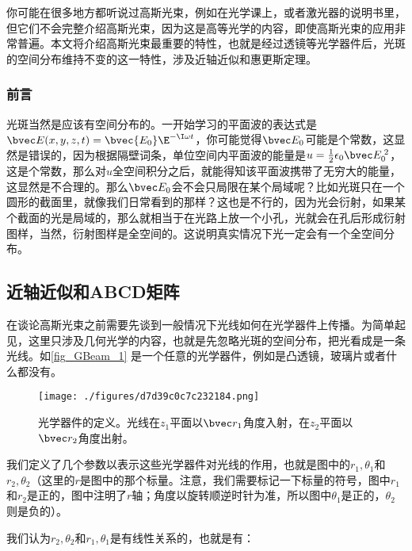 
\begin{issues}
\issueDraft
\end{issues}

你可能在很多地方都听说过高斯光束，例如在光学课上，或者激光器的说明书里，但它们不会完整介绍高斯光束，因为这是高等光学的内容，即使高斯光束的应用非常普遍。本文将介绍高斯光束最重要的特性，也就是经过透镜等光学器件后，光斑的空间分布维持不变的这一特性，涉及近轴近似和惠更斯定理。%

\subsubsection{前言}
光斑当然是应该有空间分布的。一开始学习的平面波的表达式是$\bvec E(x,y,z,t)=\bvec {E_0}\E^{-\I\omega t}$，你可能觉得$\bvec E_0$可能是个常数，这显然是错误的，因为根据隔壁词条，单位空间内平面波的能量是$u=\frac{1}{2}\epsilon_0 \bvec E_0^{\;2}$，这是个常数，那么对$u$全空间积分之后，就能得知该平面波携带了无穷大的能量，这显然是不合理的。那么$\bvec E_0$会不会只局限在某个局域呢？比如光斑只在一个圆形的截面里，就像我们日常看到的那样？这也是不行的，因为光会衍射，如果某个截面的光是局域的，那么就相当于在光路上放一个小孔，光就会在孔后形成衍射图样，当然，衍射图样是全空间的。这说明真实情况下光一定会有一个全空间分布。

\subsection{近轴近似和ABCD矩阵}
在谈论高斯光束之前需要先谈到一般情况下光线如何在光学器件上传播。为简单起见，这里只涉及几何光学的内容，也就是先忽略光斑的空间分布，把光看成是一条光线。如\autoref{fig_GBeam_1} 是一个任意的光学器件，例如是凸透镜，玻璃片或者什么都没有。
\begin{figure}[ht]
\centering
\texttt{[image: ./figures/d7d39c0c7c232184.png]}
\caption{光学器件的定义。光线在$z_1$平面以$\bvec r_1$角度入射，在$z_2$平面以$\bvec r_2$角度出射。} \label{fig_GBeam_1}
\end{figure}
我们定义了几个参数以表示这些光学器件对光线的作用，也就是图中的$r_1,\theta_1$和$r_2,\theta_2$（这里的$r$是图中的那个标量。注意，我们需要标记一下标量的符号，图中$r_1$和$r_2$是正的，图中注明了$r$轴；角度以旋转顺逆时针为准，所以图中$\theta_1$是正的，$\theta_2$则是负的）。

我们认为$r_2,\theta_2$和$r_1,\theta_1$是有线性关系的，也就是有：

